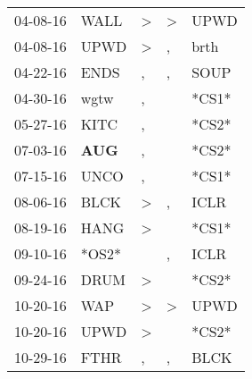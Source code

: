 \begin{supertabular}{p{0.07\textwidth}p{0.06\textwidth}p{0.02\textwidth}p{0.02\textwidth}p{0.06\textwidth}}
          04-08-16\textsuperscript{} &           WALL\textsuperscript{} &     \textgreater &     \textgreater &           UPWD\textsuperscript{} \\
          04-08-16\textsuperscript{} &           UPWD\textsuperscript{} &     \textgreater &                , &           brth\textsuperscript{} \\
          04-22-16\textsuperscript{} &           ENDS\textsuperscript{} &                , &                , &           SOUP\textsuperscript{} \\
          04-30-16\textsuperscript{} &           wgtw\textsuperscript{} &                , &                  &                            *CS1* \\
          05-27-16\textsuperscript{} &           KITC\textsuperscript{} &                , &                  &                            *CS2* \\
          07-03-16\textsuperscript{} &   \textbf{AUG\textsuperscript{}} &                , &                  &                            *CS2* \\
          07-15-16\textsuperscript{} &           UNCO\textsuperscript{} &                , &                  &                            *CS1* \\
          08-06-16\textsuperscript{} &           BLCK\textsuperscript{} &     \textgreater &                , &           ICLR\textsuperscript{} \\
          08-19-16\textsuperscript{} &           HANG\textsuperscript{} &     \textgreater &                  &                            *CS1* \\
          09-10-16\textsuperscript{} &                            *OS2* &                  &                , &           ICLR\textsuperscript{} \\
          09-24-16\textsuperscript{} &           DRUM\textsuperscript{} &     \textgreater &                  &                            *CS2* \\
          10-20-16\textsuperscript{} &            WAP\textsuperscript{} &     \textgreater &     \textgreater &           UPWD\textsuperscript{} \\
          10-20-16\textsuperscript{} &           UPWD\textsuperscript{} &     \textgreater &                  &                            *CS2* \\
          10-29-16\textsuperscript{} &           FTHR\textsuperscript{} &                , &                , &           BLCK\textsuperscript{} \\

\end{supertabular}
